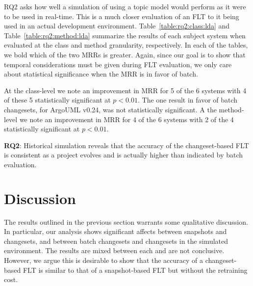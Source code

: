 RQ2 asks how well a simulation of using a topic model would perform as it were to be used in real-time.
This is a much closer evaluation of an FLT to it being used in an actual development environment.
Table~\ref{table:rq2:class:lda} and Table~\ref{table:rq2:method:lda}
summarize the results of each subject system when
evaluated at the class and method granularity, respectively.
In each of the tables, we bold which of the two MRRs is greater.
Again, since our goal is to show that temporal considerations must be given
during FLT evaluation, we only care about statistical significance when the MRR
is in favor of batch.

At the class-level we note an improvement in MRR for 5 of the 6 systems
with 4 of these 5 statistically significant at $p<0.01$.
The one result in favor of batch changesets, for ArgoUML v0.24, was not statistically significant.
A the method-level we note an improvement in MRR for 4 of the 6 systems
with 2 of the 4 statistically significant at $p<0.01$.

\begin{framed}
    \textbf{RQ2}:
    Historical simulation reveals that the accuracy of the changeset-based FLT is consistent as a project evolves and is actually higher than indicated by batch evaluation.
\end{framed}



\section{Discussion}

The results outlined in the previous section warrants some qualitative
discussion.  In particular, our analysis shows significant affects between
snapshots and changesets, and between batch changesets and changesets in the simulated environment.
The results are mixed between each and are not conclusive.  However, we argue
this is desirable to show that the accuracy of a changeset-based FLT is similar
to that of a snapshot-based FLT but without the retraining cost.

